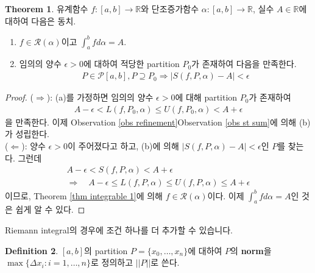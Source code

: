 \documentclass[12pt]{article}
\theoremstyle{definition}
\newtheorem{thm}{Theorem}[section]
\newtheorem{defn}[thm]{Definition}
\def\RR{\mathbb{R}}
\def\eps{\epsilon}
\def\calR{\mathcal{R}}
\newcommand{\abs}[1]{\left\vert#1\right\vert}
\newcommand{\norm}[1]{\left\vert\left\vert#1\right\vert\right\vert}
\begin{document}
\begin{thm} \label{thm st int}
	유계함수 \(f: [a, b] \rightarrow \RR\)와 단조증가함수 \(\alpha: [a, b] \rightarrow \RR\), 실수 \(A \in \RR\)에 대하여 다음은 동치.
	\begin{enumerate}[label=(\alph*), leftmargin=2\parindent]
		\item
		\(f \in \calR(\alpha)\)이고 \(\int_a^b f d\alpha = A\).
		\item
		임의의 양수 \(\eps > 0\)에 대하여 적당한 partition \(P_0\)가 존재하여 다음을 만족한다.
		\begin{gather*}
			P \in \mathcal{P}[a, b], P \supseteq P_0 \Longrightarrow \abs{S(f, P, \alpha) - A} < \eps
		\end{gather*}
	\end{enumerate}
\end{thm}
\begin{proof}
	($\Rightarrow$): (a)를 가정하면 임의의 양수 \(\eps > 0\)에 대해 partition \(P_0\)가 존재하여
	\begin{gather*}
		A - \eps < L(f, P_0, \alpha) \le U(f, P_0, \alpha) < A + \eps
	\end{gather*}
	을 만족한다. 이제 Observation \ref{obs refinement}\와 Observation \ref{obs st sum}에 의해 (b)가 성립한다.\\
	($\Leftarrow$): 양수 \(\eps > 0\)이 주어졌다고 하고, (b)에 의해 \(\abs{S(f, P, \alpha) - A} < \eps\)인 \(P\)를 찾는다. 그런데
	\begin{gather*}
		A - \eps < S(f, P, \alpha) < A + \eps\\
		\Longrightarrow \quad A - \eps \le L(f, P, \alpha) \le U(f, P, \alpha) \le A + \eps
	\end{gather*}
	이므로, Theorem \ref{thm integrable 1}에 의해 \(f \in \calR(\alpha)\)이다. 이제 \(\int_a^b f d\alpha = A\)인 것은 쉽게 알 수 있다.
\end{proof}

Riemann integral의 경우에 조건 하나를 더 추가할 수 있습니다.

\begin{defn}
	\([a, b]\)의 partition \(P = \{x_0, \ldots, x_n\}\)에 대하여 \(P\)의 \textbf{norm}을 \(\max\{\Delta x_i: i = 1, \ldots, n\}\)로 정의하고 \(\norm{P}\)로 쓴다.
\end{defn}
\end{document}
